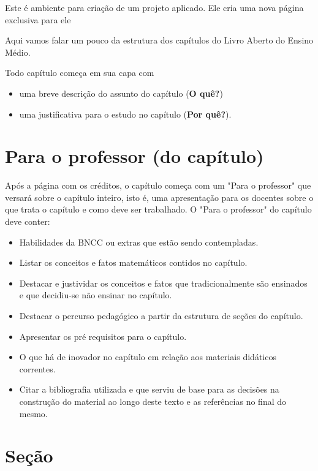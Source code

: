 \begin{project}
Este é ambiente para criação de um projeto aplicado. Ele cria uma nova página exclusiva para ele

\end{project}


Aqui vamos falar um pouco da estrutura dos capítulos do Livro Aberto do Ensino Médio.

Todo capítulo começa em sua capa com 

\begin{itemize}
\item uma breve descrição do assunto do capítulo (\textbf{O quê?})
\item uma justificativa para o estudo no capítulo (\textbf{Por quê?}).
\end{itemize} 

\section{Para o professor (do capítulo)}
Após a página com os créditos, o capítulo começa com um "Para o professor" que versará sobre o capítulo inteiro, isto é, uma apresentação para os docentes sobre o que trata o capítulo e como deve ser trabalhado. O "Para o professor" do capítulo deve conter:

\begin{itemize}
\item Habilidades da BNCC ou extras que estão sendo contempladas.
\item Listar os conceitos e fatos matemáticos contidos no capítulo.
\item Destacar e justividar os conceitos e fatos que tradicionalmente são ensinados e que decidiu-se não ensinar no capítulo.
\item Destacar o percurso pedagógico a partir da estrutura de seções do capítulo.
\item Apresentar os pré requisitos para o capítulo.
\item O que há de inovador no capítulo em relação aos materiais didáticos correntes.
\item Citar a bibliografia utilizada e que serviu de base para as decisões na construção do material ao longo deste texto e as referências no final do mesmo.
\end{itemize}

\section{Seção}

